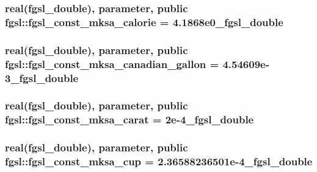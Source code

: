 \hypertarget{classfgsl_acb71a08b4387dc29400805067d9aa6ec}{
\subsubsection[{fgsl\-\_\-const\-\_\-mksa\-\_\-calorie}]{\setlength{\rightskip}{0pt plus 5cm}real({\bf fgsl\-\_\-double}), parameter, public fgsl\-::fgsl\-\_\-const\-\_\-mksa\-\_\-calorie = 4.\-1868e0\-\_\-fgsl\-\_\-double}}\label{classfgsl_acb71a08b4387dc29400805067d9aa6ec}
\hypertarget{classfgsl_a12f46f464315290d696dc0dd7d011aaf}{
\subsubsection[{fgsl\-\_\-const\-\_\-mksa\-\_\-canadian\-\_\-gallon}]{\setlength{\rightskip}{0pt plus 5cm}real({\bf fgsl\-\_\-double}), parameter, public fgsl\-::fgsl\-\_\-const\-\_\-mksa\-\_\-canadian\-\_\-gallon = 4.\-54609e-\/3\-\_\-fgsl\-\_\-double}}\label{classfgsl_a12f46f464315290d696dc0dd7d011aaf}
\hypertarget{classfgsl_ab0deb9fa34a456a2db1c8833499c5b2f}{
\subsubsection[{fgsl\-\_\-const\-\_\-mksa\-\_\-carat}]{\setlength{\rightskip}{0pt plus 5cm}real({\bf fgsl\-\_\-double}), parameter, public fgsl\-::fgsl\-\_\-const\-\_\-mksa\-\_\-carat = 2e-\/4\-\_\-fgsl\-\_\-double}}\label{classfgsl_ab0deb9fa34a456a2db1c8833499c5b2f}
\hypertarget{classfgsl_af7eed4749b386e3a913ae8e18cadc2bc}{
\subsubsection[{fgsl\-\_\-const\-\_\-mksa\-\_\-cup}]{\setlength{\rightskip}{0pt plus 5cm}real({\bf fgsl\-\_\-double}), parameter, public fgsl\-::fgsl\-\_\-const\-\_\-mksa\-\_\-cup = 2.\-36588236501e-\/4\-\_\-fgsl\-\_\-double}}\label{classfgsl_af7eed4749b386e3a913ae8e18cadc2bc}
